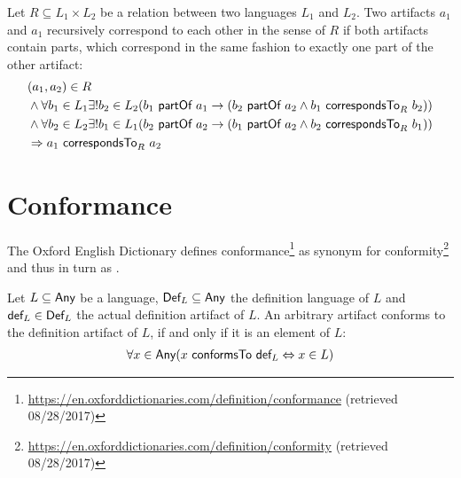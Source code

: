 \begin{definition}[Correspondence]
Let $R \subseteq L_1 \times L_2$ be a relation between two languages $L_1$ and $L_2$.
Two artifacts $a_1$ and $a_1$ recursively correspond to each other in the sense of $R$ if both artifacts contain parts, which correspond in the same fashion to exactly one part of the other artifact:
\begin{align}
\begin{split}
&(a_1,a_2) \in R
\\&\wedge \forall b_1 \in L_1 \exists! b_2 \in L_2 
(b_1 ~\textsf{partOf}~ a_1 \rightarrow (b_2 ~\textsf{partOf}~ a_2 \wedge b_1 ~\textsf{correspondsTo}_{R}~ b_2))
\\&\wedge \forall b_2 \in L_2 \exists! b_1 \in L_1 
(b_2 ~\textsf{partOf}~ a_2 \rightarrow ( b_1 ~\textsf{partOf}~ a_2 \wedge b_2 ~\textsf{correspondsTo}_{R}~ b_1))
\\&\Rightarrow a_1 ~\textsf{correspondsTo}_{R}~ a_2
\end{split}
\end{align}
\end{definition}




\section{Conformance}
The Oxford English Dictionary defines conformance\footnote{\url{https://en.oxforddictionaries.com/definition/conformance} (retrieved 08/28/2017)} as synonym for conformity\footnote{\url{https://en.oxforddictionaries.com/definition/conformity} (retrieved 08/28/2017)} and thus in turn as .

\cite{DBLP:conf/sle/Lammel16}
\begin{definition}[Conformance]
Let $L \subseteq \textsf{Any}$ be a language, $\textsf{Def}_{L} \subseteq \textsf{Any}$ the definition language of $L$ and $\textsf{def}_L \in \textsf{Def}_{L}$ the actual definition artifact of $L$.
An arbitrary artifact conforms to the definition artifact of $L$, if and only if it is an element of $L$:
\begin{align}
\forall x \in \textsf{Any} 
(x ~\textsf{conformsTo}~ \textsf{def}_L \Leftrightarrow x \in L)
\end{align}
\end{definition}
